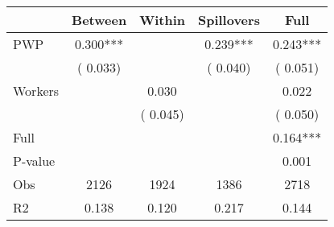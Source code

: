 
\begin{tabular}{l*{4}{c}}\hline&\multicolumn{1}{c}{Between}&\multicolumn{1}{c}{Within}&\multicolumn{1}{c}{Spillovers}&\multicolumn{1}{c}{Full}\\ \hline
 PWP           &              0.300***      &                                               &        0.239*** &         0.243***                            \\ 
                               &        (       0.033)           &                                       &       (       0.040)     &      (       0.051)                                           \\ 
 Workers       &                                               &        0.030    &                                &             0.022                            \\ 
                               &                                               & (       0.045)                  &                                        &      (       0.050)                                           \\ 
\hline                                                                                                                                                                                                                                            
 Full                  &                                               &                                               &                                        &             0.164***                                     \\ 
 P-value               &                                               &                                               &                                        &             0.001                                           \\ 
 Obs                   &               2126               &       1924                       &       1386                &              2718                                               \\ 
 R2                    &                      0.138              &              0.120                      &              0.217               &                     0.144                                              \\ 
\hline \end{tabular}                                                                                                                                                                                                              